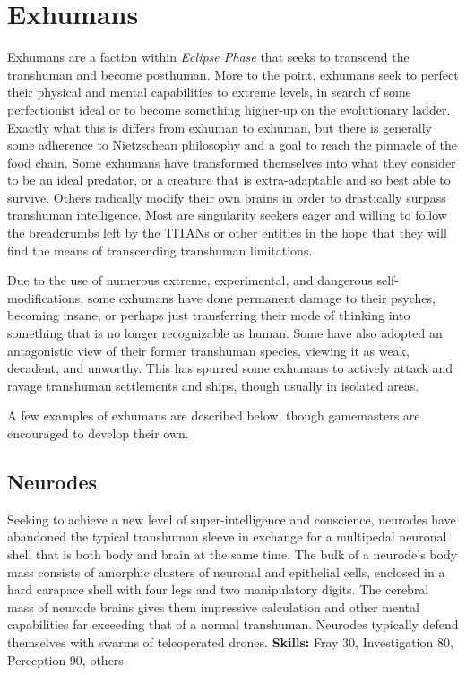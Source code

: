 \section{Exhumans }

Exhumans are a faction within \textit{Eclipse Phase} that 
seeks to transcend the transhuman and become 
posthuman. More to the point, exhumans seek to 
perfect their physical and mental capabilities to extreme
levels, in search of some perfectionist ideal or
to become something higher-up on the evolutionary 
ladder. Exactly what this is differs from exhuman to 
exhuman, but there is generally some adherence to 
Nietzschean philosophy and a goal to reach the pinnacle
of the food chain. Some exhumans have transformed
themselves into what they consider to be an
ideal predator, or a creature that is extra-adaptable 
and so best able to survive. Others radically modify 
their own brains in order to drastically surpass 
transhuman intelligence. Most are singularity seekers
eager and willing to follow the breadcrumbs
left by the TITANs or other entities in the hope that 
they will find the means of transcending transhuman
limitations.

Due to the use of numerous extreme, experimental, 
and dangerous self-modifications, some exhumans 
have done permanent damage to their psyches, 
becoming insane, or perhaps just transferring their 
mode of thinking into something that is no longer 
recognizable as human. Some have also adopted an 
antagonistic view of their former transhuman species, 
viewing it as weak, decadent, and unworthy. This 
has spurred some exhumans to actively attack and 
ravage transhuman settlements and ships, though 
usually in isolated areas.

A few examples of exhumans are described below, 
though gamemasters are encouraged to develop 
their own.

\subsection{Neurodes}

Seeking to achieve a new level of super-intelligence 
and conscience, neurodes have abandoned the typical
transhuman sleeve in exchange for a multipedal
neuronal shell that is both body and brain at the same 
time. The bulk of a neurode's body mass consists of 
amorphic clusters of neuronal and epithelial cells, enclosed
in a hard carapace shell with four legs and two
manipulatory digits. The cerebral mass of neurode 
brains gives them impressive calculation and other 
mental capabilities far exceeding that of a normal 
transhuman. Neurodes typically defend themselves 
with swarms of teleoperated drones.
\textbf{Skills:} Fray 30, Investigation 80, Perception 90, others 

